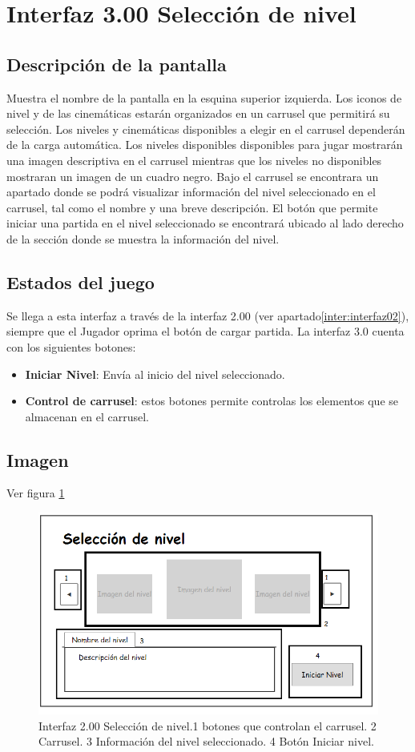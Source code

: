\section{Interfaz 3.00 Selección de nivel}\label{inter:interfaz03}
	\subsection{Descripción de la pantalla}
Muestra el nombre de la pantalla en la esquina superior izquierda.
Los iconos de nivel y de las cinemáticas estarán organizados en un carrusel que permitirá su selección. Los niveles y cinemáticas disponibles a elegir en el carrusel dependerán de la carga automática. Los niveles disponibles disponibles para jugar mostrarán una imagen descriptiva en el carrusel mientras que los niveles no disponibles mostraran un imagen de un cuadro negro.   
Bajo el carrusel se encontrara un apartado donde se podrá visualizar información del nivel seleccionado en el carrusel, tal como el nombre y una breve descripción.
El botón que permite iniciar una partida en el nivel seleccionado se encontrará ubicado al lado derecho de la sección donde se muestra la información del nivel. 
	\subsection{Estados del juego}
Se llega a esta interfaz a través de la interfaz 2.00 (ver apartado\ref{inter:interfaz02}), siempre que el Jugador oprima el botón de cargar partida.
La interfaz 3.0 cuenta con los siguientes botones:
\begin{itemize}
	\item \textbf{Iniciar Nivel}: Envía al inicio del nivel seleccionado.
	\item \textbf{Control de carrusel}: estos botones permite controlas los elementos que se almacenan en el carrusel.
\end{itemize} 
	\subsection{Imagen}
	Ver figura \ref{fig:SelNivel}
\begin{figure}
  \centering
   \includegraphics[width=0.6 \textwidth]{Imagenes/interfaz02_01}
  \caption{Interfaz 2.00 Selección de nivel.1 botones que controlan el carrusel. 2 Carrusel. 3 Información del nivel seleccionado. 4 Botón Iniciar nivel.}
  \label{fig:SelNivel}
\end{figure} 